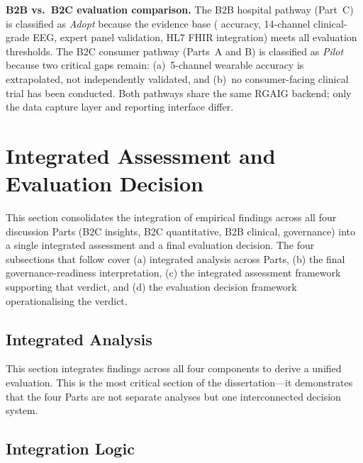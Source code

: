 \noindent\textbf{B2B vs.\ B2C evaluation comparison.} The B2B hospital pathway (Part~C) is classified as \textit{Adopt} because the evidence base (\asdacc{} accuracy, 14-channel clinical-grade EEG, expert panel validation, HL7 FHIR integration) meets all evaluation thresholds. The B2C consumer pathway (Parts~A and B) is classified as \textit{Pilot} because two critical gaps remain: (a)~5-channel wearable accuracy is extrapolated, not independently validated, and (b)~no consumer-facing clinical trial has been conducted. Both pathways share the same RGAIG backend; only the data capture layer and reporting interface differ.
\fi %

\section{Integrated Assessment and Evaluation Decision}
\label{sec:ch5_integrated_assessment_deployment}

\noindent This section consolidates the integration of empirical findings across all four discussion Parts (B2C insights, B2C quantitative, B2B clinical, governance) into a single integrated assessment and a final evaluation decision. The four subsections that follow cover (a) integrated analysis across Parts, (b) the final governance-readiness interpretation, (c) the integrated assessment framework supporting that verdict, and (d) the evaluation decision framework operationalising the verdict.

\subsection{Integrated Analysis}
\label{sec:ch5_integrated}

This section integrates findings across all four components to derive a unified evaluation. This is the most critical section of the dissertation---it demonstrates that the four Parts are not separate analyses but one interconnected decision system.

\subsection{Integration Logic}

